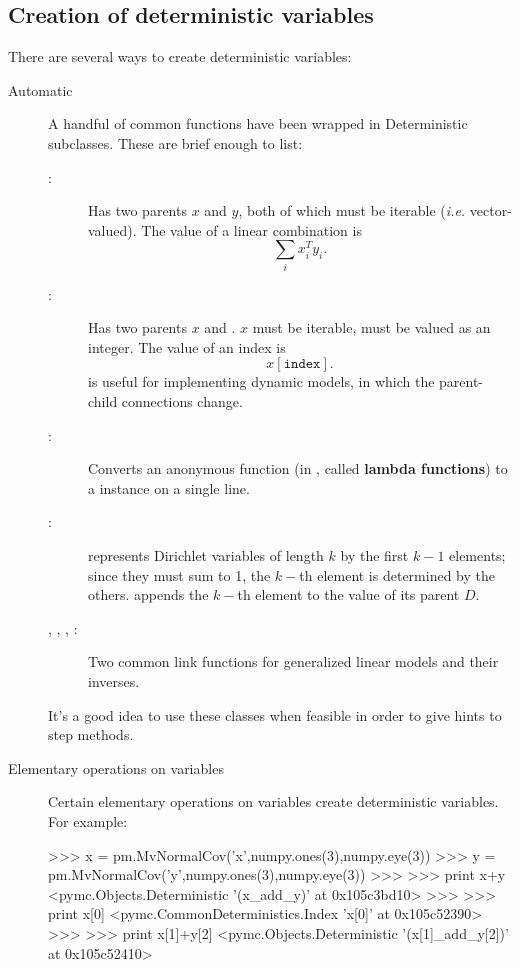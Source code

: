 \documentclass[]{jss}
\begin{document}
\subsection{Creation of deterministic variables}
There are several ways to create deterministic variables:
\begin{description}
   \item[Automatic] A handful of common functions have been wrapped in Deterministic subclasses. These are brief enough to list:
   \begin{description}
      \item[:] Has two parents $x$ and $y$, both of which must be iterable (\emph{i.e.} vector-valued). The value of a linear combination is
      \[
      \sum_i x_i^T y_i.
      \]
      \item[:] Has two parents $x$ and . $x$ must be iterable,  must be valued as an integer. The value of an index is
      \[
      x[\mathtt{index}].
      \]
       is useful for implementing dynamic models, in which the parent-child connections change.
      \item[:] Converts an anonymous function (in , called \textbf{lambda functions}) to a  instance on a single line.
      \item[:]  represents Dirichlet variables of length $k$ by the first $k-1$ elements; since they must sum to 1, the $k-$th element is determined by the others.  appends the $k-$th element to the value of its parent $D$.
      \item[, , , :] Two common link functions for generalized linear models and their inverses.
   \end{description}
   It's a good idea to use these classes when feasible in order to give hints to step methods.

   \item[Elementary operations on variables] Certain elementary operations on variables create deterministic variables. For example:   
\begin{CodeInput}
>>> x = pm.MvNormalCov('x',numpy.ones(3),numpy.eye(3))
>>> y = pm.MvNormalCov('y',numpy.ones(3),numpy.eye(3))
>>>
>>> print x+y
<pymc.Objects.Deterministic '(x_add_y)' at 0x105c3bd10>
>>>
>>> print x[0]
<pymc.CommonDeterministics.Index 'x[0]' at 0x105c52390>
>>>
>>> print x[1]+y[2]
<pymc.Objects.Deterministic '(x[1]_add_y[2])' at 0x105c52410>
\end{CodeInput}


\end{description}
\end{document}
